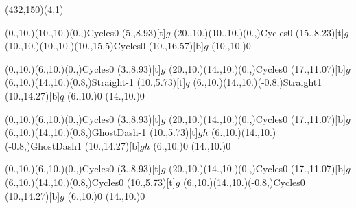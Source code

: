 \unitlength=1bp%

\begin{feynartspicture}(432,150)(4,1)

\FADiagram{}
\FAProp(0.,10.)(10.,10.)(0.,){Cycles}{0}
\FALabel(5.,8.93)[t]{$g$}
\FAProp(20.,10.)(10.,10.)(0.,){Cycles}{0}
\FALabel(15.,8.23)[t]{$g$}
\FAProp(10.,10.)(10.,10.)(10.,15.5){Cycles}{0}
\FALabel(10.,16.57)[b]{$g$}
\FAVert(10.,10.){0}

\FADiagram{}
\FAProp(0.,10.)(6.,10.)(0.,){Cycles}{0}
\FALabel(3.,8.93)[t]{$g$}
\FAProp(20.,10.)(14.,10.)(0.,){Cycles}{0}
\FALabel(17.,11.07)[b]{$g$}
\FAProp(6.,10.)(14.,10.)(0.8,){Straight}{-1}
\FALabel(10.,5.73)[t]{$q$}
\FAProp(6.,10.)(14.,10.)(-0.8,){Straight}{1}
\FALabel(10.,14.27)[b]{$q$}
\FAVert(6.,10.){0}
\FAVert(14.,10.){0}

\FADiagram{}
\FAProp(0.,10.)(6.,10.)(0.,){Cycles}{0}
\FALabel(3.,8.93)[t]{$g$}
\FAProp(20.,10.)(14.,10.)(0.,){Cycles}{0}
\FALabel(17.,11.07)[b]{$g$}
\FAProp(6.,10.)(14.,10.)(0.8,){GhostDash}{-1}
\FALabel(10.,5.73)[t]{$gh$}
\FAProp(6.,10.)(14.,10.)(-0.8,){GhostDash}{1}
\FALabel(10.,14.27)[b]{$gh$}
\FAVert(6.,10.){0}
\FAVert(14.,10.){0}

\FADiagram{}
\FAProp(0.,10.)(6.,10.)(0.,){Cycles}{0}
\FALabel(3.,8.93)[t]{$g$}
\FAProp(20.,10.)(14.,10.)(0.,){Cycles}{0}
\FALabel(17.,11.07)[b]{$g$}
\FAProp(6.,10.)(14.,10.)(0.8,){Cycles}{0}
\FALabel(10.,5.73)[t]{$g$}
\FAProp(6.,10.)(14.,10.)(-0.8,){Cycles}{0}
\FALabel(10.,14.27)[b]{$g$}
\FAVert(6.,10.){0}
\FAVert(14.,10.){0}
\end{feynartspicture}

